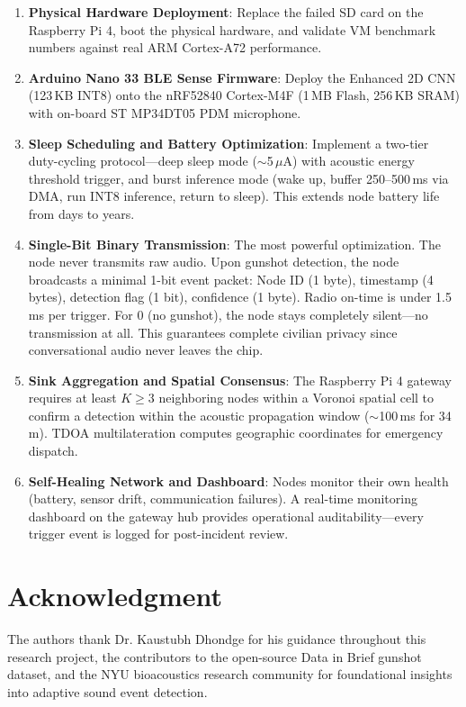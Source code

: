 \documentclass[conference]{IEEEtran}
\begin{document}
\begin{enumerate}
    \item \textbf{Physical Hardware Deployment}: Replace the failed SD card on the Raspberry Pi 4, boot the physical hardware, and validate VM benchmark numbers against real ARM Cortex-A72 performance.
    \item \textbf{Arduino Nano 33 BLE Sense Firmware}: Deploy the Enhanced 2D CNN (123\,KB INT8) onto the nRF52840 Cortex-M4F (1\,MB Flash, 256\,KB SRAM) with on-board ST MP34DT05 PDM microphone.
    \item \textbf{Sleep Scheduling and Battery Optimization}: Implement a two-tier duty-cycling protocol---deep sleep mode ($\sim$5\,$\mu$A) with acoustic energy threshold trigger, and burst inference mode (wake up, buffer 250--500\,ms via DMA, run INT8 inference, return to sleep). This extends node battery life from days to years.
    \item \textbf{Single-Bit Binary Transmission}: The most powerful optimization. The node never transmits raw audio. Upon gunshot detection, the node broadcasts a minimal 1-bit event packet: Node ID (1 byte), timestamp (4 bytes), detection flag (1 bit), confidence (1 byte). Radio on-time is under 1.5\,ms per trigger. For 0 (no gunshot), the node stays completely silent---no transmission at all. This guarantees complete civilian privacy since conversational audio never leaves the chip.
    \item \textbf{Sink Aggregation and Spatial Consensus}: The Raspberry Pi 4 gateway requires at least $K \ge 3$ neighboring nodes within a Voronoi spatial cell to confirm a detection within the acoustic propagation window ($\sim$100\,ms for 34\,m). TDOA multilateration computes geographic coordinates for emergency dispatch.
    \item \textbf{Self-Healing Network and Dashboard}: Nodes monitor their own health (battery, sensor drift, communication failures). A real-time monitoring dashboard on the gateway hub provides operational auditability---every trigger event is logged for post-incident review.
\end{enumerate}

\section*{Acknowledgment}
The authors thank Dr. Kaustubh Dhondge for his guidance throughout this research project, the contributors to the open-source Data in Brief gunshot dataset, and the NYU bioacoustics research community for foundational insights into adaptive sound event detection.
\end{document}
